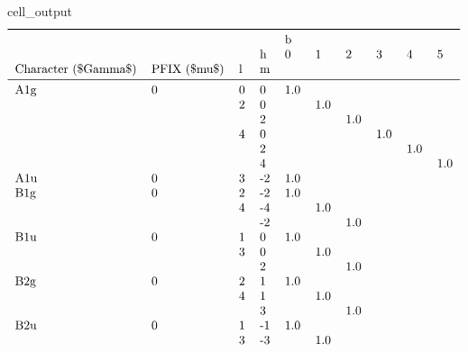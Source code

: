 \documentclass[letterpaper,table,10pt,english]{jupyterBook}
\begin{document}
\begin{figure}[htbp]
\centering
\capstart
\begin{sphinxVerbatimOutput}

\begin{sphinxuseclass}{cell_output}\begin{equation*}
\begin{split}\begin{tabular}{llllllllll}
\toprule
    &   &   & {} & \multicolumn{6}{l}{b} \\
    &   &   & h &    0 &    1 &    2 &    3 &    4 &    5 \\
Character (\$\textbackslash Gamma\$) & PFIX (\$\textbackslash mu\$) & l & m &      &      &      &      &      &      \\
\midrule
A1g & 0 & 0 &  0 &  1.0 &      &      &      &      &      \\
    &   & 2 &  0 &      &  1.0 &      &      &      &      \\
    &   &   &  2 &      &      &  1.0 &      &      &      \\
    &   & 4 &  0 &      &      &      &  1.0 &      &      \\
    &   &   &  2 &      &      &      &      &  1.0 &      \\
    &   &   &  4 &      &      &      &      &      &  1.0 \\
A1u & 0 & 3 & -2 &  1.0 &      &      &      &      &      \\
B1g & 0 & 2 & -2 &  1.0 &      &      &      &      &      \\
    &   & 4 & -4 &      &  1.0 &      &      &      &      \\
    &   &   & -2 &      &      &  1.0 &      &      &      \\
B1u & 0 & 1 &  0 &  1.0 &      &      &      &      &      \\
    &   & 3 &  0 &      &  1.0 &      &      &      &      \\
    &   &   &  2 &      &      &  1.0 &      &      &      \\
B2g & 0 & 2 &  1 &  1.0 &      &      &      &      &      \\
    &   & 4 &  1 &      &  1.0 &      &      &      &      \\
    &   &   &  3 &      &      &  1.0 &      &      &      \\
B2u & 0 & 1 & -1 &  1.0 &      &      &      &      &      \\
    &   & 3 & -3 &      &  1.0 &      &      &      &      \\

\end{tabular}
\end{split}
\end{equation*}
\end{sphinxuseclass}
\end{sphinxVerbatimOutput}
\end{figure}
\end{document}
